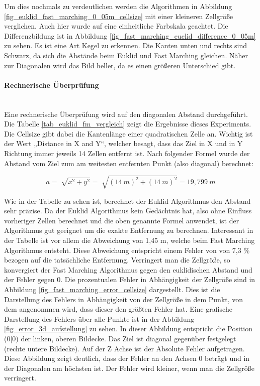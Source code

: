 Um dies nochmals zu verdeutlichen werden die Algorithmen in Abbildung \ref{fig_euklid_fast_marching_0_05m_cellsize} mit einer kleineren Zellgröße verglichen. Auch hier wurde auf eine einheitliche Farbskala geachtet. Die Differenzbildung ist in Abbildung \ref{fig_fast_marching_euclid_difference_0_05m} zu sehen. Es ist eine Art Kegel zu erkennen. Die Kanten unten und rechts sind Schwarz, da sich die Abstände beim Euklid und Fast Marching gleichen. Näher zur Diagonalen wird das Bild heller, da es einen größeren Unterschied gibt.

\paragraph{Rechnerische Überprüfung}\\
Eine rechnerische Überprüfung wird auf den diagonalen Abstand durchgeführt. Die Tabelle \ref{tab_euklid_fm_vergleich} zeigt die Ergebnisse dieses Experiments. Die Cellsize gibt dabei die Kantenlänge einer quadratischen Zelle an. Wichtig ist der Wert „Distance in X and Y“, welcher besagt, dass das Ziel in X und in Y Richtung immer jeweils 14 Zellen entfernt ist.
Nach folgender Formel wurde der Abstand vom Ziel zum am weitesten entfernten Punkt (also diagonal) berechnet:

$$a = \sqrt[]{x^2 +y^2} = \sqrt[]{(14\ m) ^2 +(14\ m) ^2} = 19,799\ m$$ 

Wie in der Tabelle zu sehen ist, berechnet der Euklid Algorithmus den Abstand sehr präzise. Da der Euklid Algorithmus kein \glqq Gedächtnis\grqq{} hat, also ohne Einfluss vorheriger Zellen berechnet und die oben genannte Formel anwendet, ist der Algorithmus gut geeignet um die exakte Entfernung zu berechnen. Interessant in der Tabelle ist vor allem die Abweichung von 1,45 m, welche beim Fast Marching Algorithmus entsteht. Diese Abweichung entspricht einem Fehler von von 7,3 \% bezogen auf die tatsächliche Entfernung. Verringert man die Zellgröße, so konvergiert der Fast Marching Algorithmus gegen den euklidischen Abstand und der Fehler gegen 0. Die prozentualen Fehler in Abhängigkeit der Zellgröße sind in Abbildung \ref{fig_fast_marching_error_cellsize} dargestellt. Dies ist die Darstellung des Fehlers in Abhängigkeit von der Zellgröße in dem Punkt, von dem angenommen wird, dass dieser den größten Fehler hat. Eine grafische Darstellung des Fehlers über alle Punkte ist in der Abbildung \ref{fig_error_3d_aufstellung} zu sehen. In dieser Abbildung entspricht die Position (0|0) der linken, oberen Bildecke. Das Ziel ist diagonal gegenüber festgelegt (rechte untere Bildecke). Auf der Z Achse ist der Absolute Fehler aufgetragen. Diese Abbildung zeigt deutlich, dass der Fehler an den Achsen 0 beträgt und in der Diagonalen am höchsten ist. Der Fehler wird kleiner, wenn man die Zellgröße verringert.



